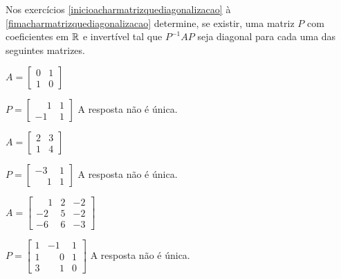 \documentclass[12pt]{exam}
\begin{document}
Nos exercícios \eqref{inicioacharmatrizquediagonalizacao} à \eqref{fimacharmatrizquediagonalizacao} determine, se existir, uma matriz $P$ com coeficientes em $\mathbb{R}$ e invertível tal que $P^{-1}AP$ seja diagonal para cada uma das seguintes matrizes.

\begin{exercicio}\label{inicioacharmatrizquediagonalizacao}
    $A = \begin{bmatrix} 0 & 1\\ 1 & 0\end{bmatrix}$

    \begin{solucao}
        $P = \begin{bmatrix}
            \phantom{-} 1 & 1\\ -1 & 1
        \end{bmatrix}$ A resposta não é única.
    \end{solucao}
\end{exercicio}

\begin{exercicio}
    $A = \begin{bmatrix} 2 & 3\\ 1 & 4\end{bmatrix}$

    \begin{solucao}
        $P = \begin{bmatrix}
            -3 & 1\\ \phantom{-} 1 & 1
        \end{bmatrix}$ A resposta não é única.
    \end{solucao}
\end{exercicio}

\begin{exercicio}
    $A = \begin{bmatrix} \phantom{-} 1 & 2 & -2\\ -2 & 5 & -2\\ -6 & 6 & -3\end{bmatrix}$

    \begin{solucao}
        $P = \begin{bmatrix}
            1 & -1 & 1\\ 1 & \phantom{-} 0 & 1\\ 3 & \phantom{-} 1 & 0
        \end{bmatrix}$ A resposta não é única.
    \end{solucao}
\end{exercicio}
\end{document}

